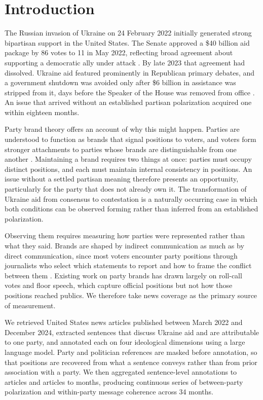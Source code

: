 \section{Introduction}


The Russian invasion of Ukraine on 24 February 2022 initially generated strong bipartisan support in the United States. The Senate approved a \$40 billion aid package by 86 votes to 11 in May 2022, reflecting broad agreement about supporting a democratic ally under attack \citep{framWATCHSenateSends2022}. By late 2023 that agreement had dissolved. Ukraine aid featured prominently in Republican primary debates, and a government shutdown was avoided only after \$6 billion in assistance was stripped from it, days before the Speaker of the House was removed from office \citep{wangCandidatesDifferencesUkraine2023}. An issue that arrived without an established partisan polarization acquired one within eighteen months.

Party brand theory offers an account of why this might happen. Parties are understood to function as brands that signal positions to voters, and voters form stronger attachments to parties whose brands are distinguishable from one another \citep{lupuPartyBrandsPartisanship2013,lupuPartyBrandsCrisis2016}. Maintaining a brand requires two things at once: parties must occupy distinct positions, and each must maintain internal consistency in positions. An issue without a settled partisan meaning therefore presents an opportunity, particularly for the party that does not already own it. The transformation of Ukraine aid from consensus to contestation is a naturally occurring case in which both conditions can be observed forming rather than inferred from an established polarization.

Observing them requires measuring how parties were represented rather than what they said. Brands are shaped by indirect communication as much as by direct communication, since most voters encounter party positions through journalists who select which statements to report and how to frame the conflict between them \citep{karlbergPartisanBrandingMedia2002,levenduskyDoesMediaCoverage2016}. Existing work on party brands has drawn largely on roll-call votes and floor speech, which capture official positions but not how those positions reached publics. We therefore take news coverage as the primary source of measurement.

We retrieved United States news articles published between March 2022 and December 2024, extracted sentences that discuss Ukraine aid and are attributable to one party, and annotated each on four ideological dimensions using a large language model. Party and politician references are masked before annotation, so that positions are recovered from what a sentence conveys rather than from prior association with a party. We then aggregated sentence-level annotations to articles and articles to months, producing continuous series of between-party polarization and within-party message coherence across 34 months.

